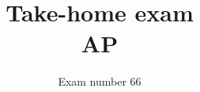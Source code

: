 \documentclass[12pt,a4paper]{article}
\begin{document}
\title{%
  Take-home exam \\
  AP
}%
\author{Exam number 66}

\maketitle
\thispagestyle{empty}
\newpage
\setcounter{page}{1}





\newpage
\appendix
%  
%
%  
%  
%  
%  
%  
\end{document}
